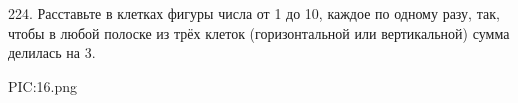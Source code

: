 224. Расставьте в клетках фигуры числа от 1 до 10, каждое по одному разу, так, чтобы в любой полоске из трёх клеток (горизонтальной или вертикальной) сумма делилась на 3.
\begin{center}
{{PIC:16.png}}
\end{center}
